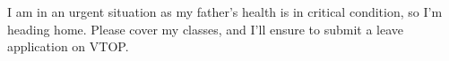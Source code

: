 I am in an urgent situation as my father’s health is in critical condition, so I’m heading home. Please cover my classes, and I’ll ensure to submit a leave application on VTOP.